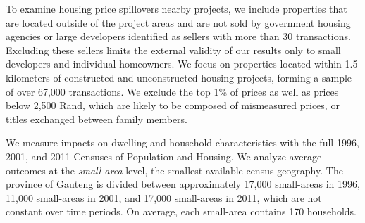 \documentclass[12pt]{article}
\begin{document}





To examine housing price spillovers nearby projects, we include properties that are located outside of the project areas and are not sold by government housing agencies or large developers identified as sellers with more than 30 transactions.  Excluding these sellers limits the external validity of our results only to small developers and individual homeowners.  We focus on properties located within 1.5 kilometers of constructed and unconstructed housing projects, forming a sample of over 67,000 transactions.  We exclude the top 1\% of prices as well as prices below 2,500 Rand, which are likely to be composed of mismeasured prices, or titles exchanged between family members. 



We measure impacts on dwelling and household characteristics with the full 1996, 2001, and 2011 Censuses of Population and Housing. We analyze average outcomes at the {\it small-area} level, the smallest available census geography. The province of Gauteng is divided between approximately 17,000 small-areas in 1996, 11,000 small-areas in 2001, and 17,000 small-areas in 2011, which are not constant over time periods.  On average, each small-area contains 170 households. 
\end{document}
